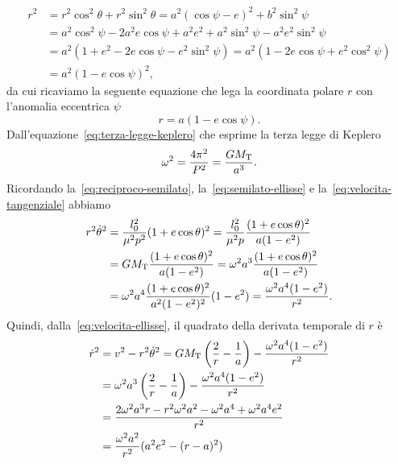 \begin{equation}
  \begin{split}
    r^2 &= r^2\cos^2\theta + r^2\sin^2\theta = a^2(\cos\psi - e)^2 +
    b^2\sin^2\psi\\ 
    &= a^2\cos^2\psi-2a^2e\cos\psi+a^2e^2+a^2\sin^2\psi-a^2e^2\sin^2\psi\\
    &= a^2(1+e^2-2e\cos\psi-e^2\sin^2\psi) = a^2(1-2e\cos\psi+e^2\cos^2\psi)\\
    &= a^2(1 - e\cos\psi)^2,
  \end{split}
\end{equation}
da cui ricaviamo la seguente equazione che lega la coordinata polare $r$ con
l'anomalia eccentrica $\psi$
\begin{equation}
  \label{eq:r-anomalia-eccentrica}
  r = a(1 - e\cos\psi).
\end{equation}
Dall'equazione~\eqref{eq:terza-legge-keplero} che esprime la terza legge di
Keplero
\begin{equation}
  \omega^2 = \frac{4\pi^2}{P^2} = \frac{GM_\textup{T}}{a^3}.
\end{equation}
Ricordando la~\eqref{eq:reciproco-semilato}, la~\eqref{eq:semilato-ellisse} e
la~\eqref{eq:velocita-tangenziale} abbiamo
\begin{equation}
  \begin{split}
    r^2\dot{\theta}^2 &= \frac{l_0^2}{\mu^2p^2}(1 + e\cos\theta)^2 =
    \frac{l_0^2}{\mu^2p} \frac{(1+e\cos\theta)^2}{a(1-e^2)} \\
    &= GM_\textup{T} \frac{(1+e\cos\theta)^2}{a(1-e^2)} = \omega^2a^3
    \frac{(1+e\cos\theta)^2}{a(1-e^2)} \\
    &= \omega^2a^4 \frac{(1+e\cos\theta)^2}{a^2(1-e^2)^2}(1-e^2) =
    \frac{\omega^2a^4(1-e^2)}{r^2}.
  \end{split}
\end{equation}
Quindi, dalla~\eqref{eq:velocita-ellisse}, il quadrato della derivata temporale
di $r$ è
\begin{equation}
  \begin{split}
    \dot{r}^2 &= v^2 - r^2\dot{\theta}^2 = GM_\textup{T}
    \left(
      \frac{2}{r} - \frac{1}{a}
    \right) - \frac{\omega^2a^4(1-e^2)}{r^2} \\
        &= \omega^2a^3
    \left(
      \frac{2}{r} - \frac{1}{a}
    \right) - \frac{\omega^2a^4(1-e^2)}{r^2} \\
    &= \frac{2\omega^2a^3r-r^2\omega^2a^2-\omega^2a^4+\omega^2a^4e^2}{r^2}\\
    &= \frac{\omega^2a^2}{r^2}(a^2e^2-(r-a)^2)
  \end{split}
\end{equation}
